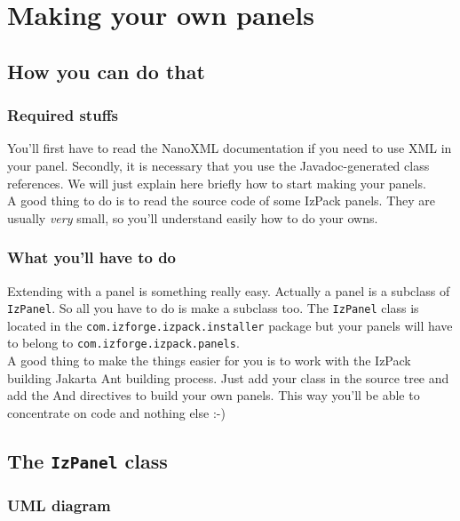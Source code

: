 \chapter{Making your own panels}

\section{How you can do that}

\subsection{Required stuffs}

You'll first have to read the NanoXML documentation if you need to use XML in
your panel. Secondly, it is necessary that you use the Javadoc-generated class
references. We will just explain here briefly how to start making your panels.\\

A good thing to do is to read the source code of some IzPack panels. They are
usually \textsl{very} small, so you'll understand easily how to do your owns.\\

\subsection{What you'll have to do}

Extending \IzPack with a panel is something really easy. Actually a panel is a
subclass of \texttt{IzPanel}. So all you have to do is make a subclass too. The
\texttt{IzPanel} class is located in the \texttt{com.izforge.izpack.installer}
package but your panels will have to belong to
\texttt{com.izforge.izpack.panels}.\\

A good thing to make the things easier for you is to work with the IzPack
building Jakarta Ant building process. Just add your class in the source tree
and add the And directives to build your own panels. This way you'll be able to
concentrate on code and nothing else :-)\\

\section{The \texttt{IzPanel} class}

\subsection{UML diagram}

